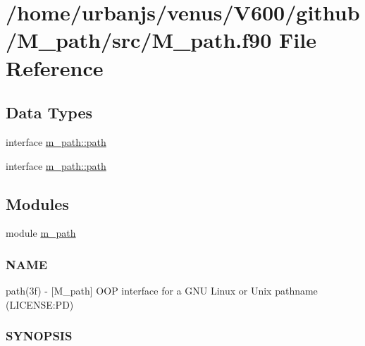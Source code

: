 \hypertarget{M__path_8f90}{}\section{/home/urbanjs/venus/\+V600/github/\+M\+\_\+path/src/\+M\+\_\+path.f90 File Reference}
\label{M__path_8f90}
\subsection*{Data Types}
\begin{DoxyCompactItemize}
\item 
interface \mbox{\hyperlink{structm__path_1_1path}{m\+\_\+path\+::path}}
\item 
interface \mbox{\hyperlink{structm__path_1_1path}{m\+\_\+path\+::path}}
\end{DoxyCompactItemize}
\subsection*{Modules}
\begin{DoxyCompactItemize}
\item 
module \mbox{\hyperlink{namespacem__path}{m\+\_\+path}}
\begin{DoxyCompactList}\small\item\em \subsubsection*{N\+A\+ME}

path(3f) -\/ \mbox{[}M\+\_\+path\mbox{]} O\+OP interface for a G\+NU Linux or Unix pathname (L\+I\+C\+E\+N\+SE\+:PD) \subsubsection*{S\+Y\+N\+O\+P\+S\+IS}\end{DoxyCompactList}\end{DoxyCompactItemize}
